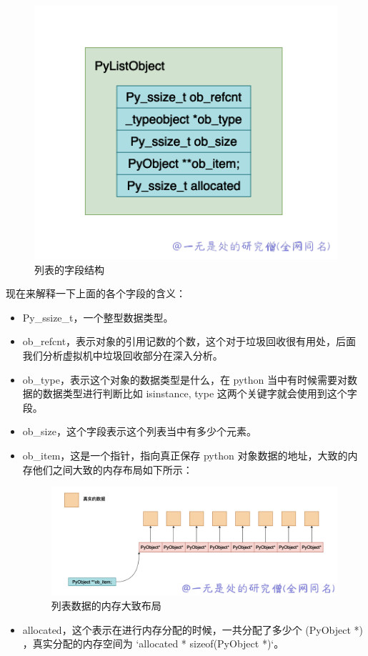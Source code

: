     \begin{figure}[h]
        \centering
            \includegraphics[scale=.5]{images/01-list.png}
            \caption{列表的字段结构}
        \label{fig:my_label}
    \end{figure}
    
现在来解释一下上面的各个字段的含义：
\begin{itemize}
\item Py\_ssize\_t，一个整型数据类型。 
\item ob\_refcnt，表示对象的引用记数的个数，这个对于垃圾回收很有用处，后面我们分析虚拟机中垃圾回收部分在深入分析。 
\item ob\_type，表示这个对象的数据类型是什么，在 python 当中有时候需要对数据的数据类型进行判断比如 isinstance, type 这两个关键字就会使用到这个字段。 
\item ob\_size，这个字段表示这个列表当中有多少个元素。 
\item ob\_item，这是一个指针，指向真正保存 python 对象数据的地址，大致的内存他们之间大致的内存布局如下所示： 

    \begin{figure}[h]
        \centering
            \includegraphics[scale=.3]{images/02-list.png}
        \caption{列表数据的内存大致布局}
        \label{fig:my_label}
    \end{figure}
    
\item allocated，这个表示在进行内存分配的时候，一共分配了多少个 (PyObject *) ，真实分配的内存空间为 `allocated * sizeof(PyObject *)`。 
\end{itemize}
